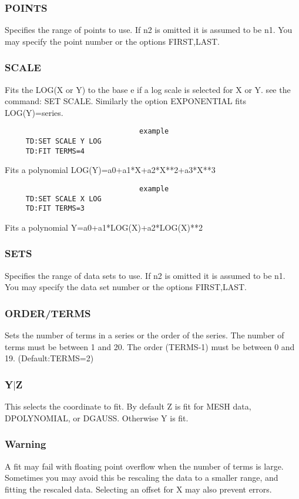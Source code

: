 \subsubsection{POINTS      }
Specifies  the  range of points to use.  If n2 is omitted it is assumed
to be n1.  You may specify the point number or the options FIRST,LAST. 
\subsubsection{SCALE       }
Fits  the  LOG(X or Y)  to  the  base  e if a log scale is selected for
X or Y.  see the command:  SET SCALE.  Similarly the option EXPONENTIAL
fits LOG(Y)=series.  

\begin{verbatim}
                                example
     TD:SET SCALE Y LOG 
     TD:FIT TERMS=4 
\end{verbatim}
Fits a polynomial LOG(Y)=a0+a1*X+a2*X**2+a3*X**3 
\begin{verbatim}
                                example
     TD:SET SCALE X LOG 
     TD:FIT TERMS=3 
\end{verbatim}
Fits a polynomial Y=a0+a1*LOG(X)+a2*LOG(X)**2 
\subsubsection{SETS        }
Specifies  the  range  of  data  sets  to  use.  If n2 is omitted it is
assumed to be n1.  You may specify the data set number or  the  options
FIRST,LAST.  
\subsubsection{ORDER/TERMS }
Sets  the  number of terms in a series or the order of the series.  The
number of terms must be between 1 and 20.  The order (TERMS-1) must  be
between 0 and 19.  
(Default:TERMS=2) 
\subsubsection{Y$|$Z         }
This selects the coordinate to fit.  By default Z is fit for MESH data,
DPOLYNOMIAL, or DGAUSS.  Otherwise Y is fit.  
\subsubsection{Warning     }
A fit may fail with floating point overflow when the number of terms is
large.  Sometimes you may avoid this be rescaling the data to a smaller
range,  and  fitting  the rescaled data.  Selecting an offset for X may
also prevent errors.  

